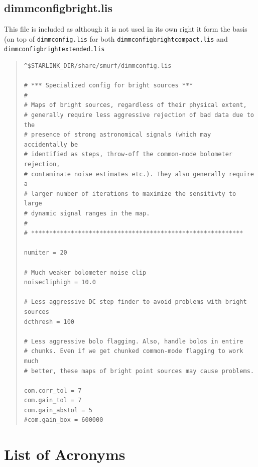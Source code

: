 \documentclass[twoside,11pt]{article}
\newcommand{\xlabel}[1]{}
\renewcommand{\_}{\texttt{\symbol{95}}}
\newenvironment{myquote}{\begin{quote}\begin{small}}{\end{small}\end{quote}}
\begin{document}
\subsection{dimmconfig\_bright.lis}

This file is included as although it is not used in its own right it
form the basis (on top of \texttt{dimmconfig.lis} for both
\texttt{dimmconfig\_bright\_compact.lis} and
\texttt{dimmconfig\_bright\_extended.lis}
\begin{myquote}
\begin{verbatim}
^$STARLINK_DIR/share/smurf/dimmconfig.lis

# *** Specialized config for bright sources ***
#
# Maps of bright sources, regardless of their physical extent,
# generally require less aggressive rejection of bad data due to the
# presence of strong astronomical signals (which may accidentally be
# identified as steps, throw-off the common-mode bolometer rejection,
# contaminate noise estimates etc.). They also generally require a
# larger number of iterations to maximize the sensitivty to large
# dynamic signal ranges in the map.
#
# ***********************************************************

numiter = 20

# Much weaker bolometer noise clip
noisecliphigh = 10.0

# Less aggressive DC step finder to avoid problems with bright sources
dcthresh = 100

# Less aggressive bolo flagging. Also, handle bolos in entire
# chunks. Even if we get chunked common-mode flagging to work much
# better, these maps of bright point sources may cause problems.

com.corr_tol = 7
com.gain_tol = 7
com.gain_abstol = 5
#com.gain_box = 600000
\end{verbatim}
\end{myquote}

\section{\xlabel{acronyms}List of Acronyms}
\end{document}
